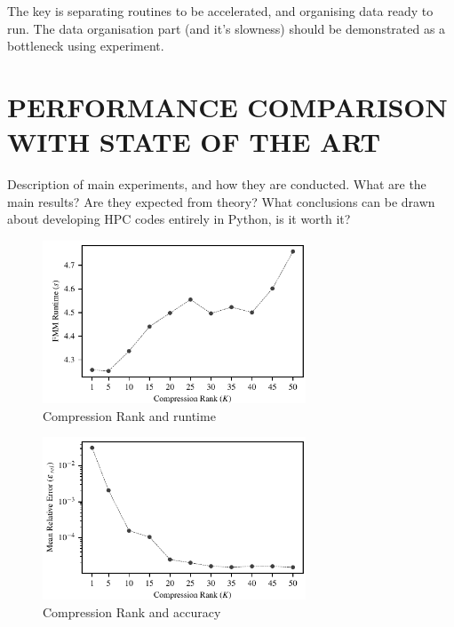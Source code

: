 \documentclass{IEEEcsmag}
\begin{document}
The key is separating routines to be accelerated, and organising data ready to run. The data organisation part (and it's slowness) should be demonstrated as a bottleneck using experiment.

\section{PERFORMANCE COMPARISON WITH STATE OF THE ART}

Description of main experiments, and how they are conducted. What are the main results? Are they expected from theory? What conclusions can be drawn about developing HPC codes entirely in Python, is it worth it?

\begin{figure}
\centerline{\includegraphics[width=18.5pc]{figures/compression_runtime.pdf}}
\caption{Compression Rank and runtime}
\end{figure}

\begin{figure}
\centerline{\includegraphics[width=18.5pc]{figures/compression_accuracy.pdf}}
\caption{Compression Rank and accuracy}
\end{figure}
\end{document}
